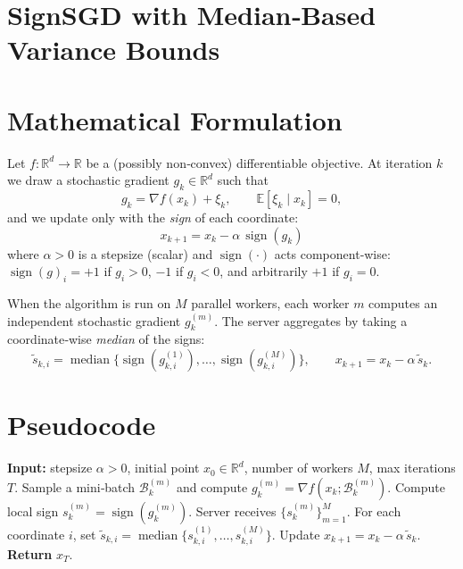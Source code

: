 \documentclass{article}
\newcommand{\sign}{\operatorname{sign}}
\newcommand{\E}{\mathbb{E}}
\newcommand{\R}{\mathbb{R}}
\begin{document}
\section*{SignSGD with Median‑Based Variance Bounds}

\section*{Mathematical Formulation}
Let $f:\R^{d}\to\R$ be a (possibly non‑convex) differentiable objective.  
At iteration $k$ we draw a stochastic gradient $g_{k}\in\R^{d}$ such that
\[
g_{k}= \nabla f(x_{k}) + \xi_{k},\qquad \E[\xi_{k}\mid x_{k}]=0,
\]
and we update only with the \emph{sign} of each coordinate:
\begin{equation}
\boxed{ \; x_{k+1}= x_{k}-\alpha\,\sign(g_{k}) \; } \label{eq:update}
\end{equation}
where $\alpha>0$ is a stepsize (scalar) and $\sign(\cdot)$ acts component‑wise:
$\sign(g)_{i}=+1$ if $g_{i}>0$, $-1$ if $g_{i}<0$, and arbitrarily $+1$ if $g_{i}=0$.

When the algorithm is run on $M$ parallel workers, each worker $m$ computes an
independent stochastic gradient $g_{k}^{(m)}$.  The server aggregates by taking a
coordinate‑wise \emph{median} of the signs:
\[
\tilde{s}_{k,i}= \operatorname{median}\bigl\{\sign(g_{k,i}^{(1)}),\dots,
\sign(g_{k,i}^{(M)})\bigr\},
\qquad
x_{k+1}=x_{k}-\alpha\,\tilde{s}_{k}.
\tag{1}
\]

\section*{Pseudocode}
\begin{algorithm}[H]
\caption{SignSGD with Median Aggregation}
\begin{algorithmic}[1]
\STATE \textbf{Input:} stepsize $\alpha>0$, initial point $x_{0}\in\R^{d}$,
number of workers $M$, max iterations $T$.
        \STATE Sample a mini‑batch $\mathcal{B}_{k}^{(m)}$ and compute
        $g_{k}^{(m)}=\nabla f(x_{k};\mathcal{B}_{k}^{(m)})$.
        \STATE Compute local sign $s_{k}^{(m)}=\sign(g_{k}^{(m)})$.
    \ENDFOR
    \STATE Server receives $\{s_{k}^{(m)}\}_{m=1}^{M}$.
    \STATE For each coordinate $i$, set $\tilde{s}_{k,i}
            =\operatorname{median}\{s_{k,i}^{(1)},\dots,s_{k,i}^{(M)}\}$.
    \STATE Update $x_{k+1}=x_{k}-\alpha\,\tilde{s}_{k}$.
\ENDFOR
\STATE \textbf{Return} $x_{T}$.
\end{algorithmic}
\end{algorithm}
\end{document}
